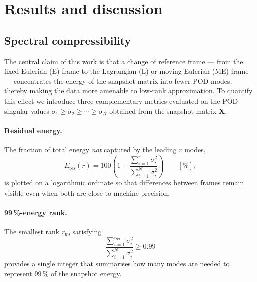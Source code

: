 \documentclass[11pt,a4paper]{article}
\begin{document}
	\section{Results and discussion}\label{sec:results}
	
	\subsection{Spectral compressibility}\label{sec:compress}
	
	The central claim of this work is that a change of reference frame ---
	from the fixed Eulerian (E) frame to the Lagrangian (L) or
	moving-Eulerian (ME) frame --- concentrates the energy of the snapshot
	matrix into fewer POD modes, thereby making the data more amenable to
	low-rank approximation.
	To quantify this effect we introduce three complementary metrics
	evaluated on the POD singular values
	$\sigma_1 \geq \sigma_2 \geq \cdots \geq \sigma_N$
	obtained from the snapshot matrix $\mathbf{X}$.
	
	\paragraph{Residual energy.}
	The fraction of total energy \emph{not} captured by the leading $r$
	modes,
	\begin{equation}\label{eq:Eres}
		E_{\mathrm{res}}(r)
		= 100 \left(1 - \frac{\sum_{i=1}^{r}\sigma_i^{2}}
		                      {\sum_{i=1}^{N}\sigma_i^{2}}\right)
		\qquad [\%],
	\end{equation}
	is plotted on a logarithmic ordinate so that differences between
	frames remain visible even when both are close to machine precision.
	
	\paragraph{99\,\%-energy rank.}
	The smallest rank $r_{99}$ satisfying
	\begin{equation}\label{eq:r99}
		\frac{\sum_{i=1}^{r_{99}}\sigma_i^{2}}
		     {\sum_{i=1}^{N}\sigma_i^{2}} \geq 0.99
	\end{equation}
	provides a single integer that summarises how many modes are needed to
	represent 99\,\% of the snapshot energy.
	
\end{document}
